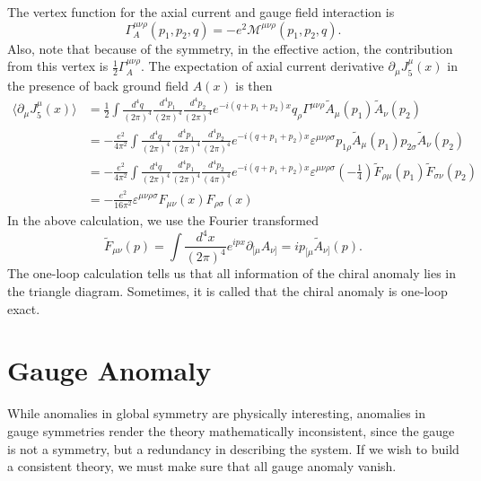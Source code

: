 \documentclass[aps,prb,superscriptaddress,nofootinbib]{revtex4}
\begin{document}
The vertex function for the axial current and gauge field interaction is
\begin{equation}
	\Gamma_A^{\mu\nu\rho}(p_1,p_2,q) = -e^2 \mathcal{M}^{\mu\nu\rho}(p_1,p_2,q).
\end{equation}
Also, note that because of the symmetry, in the effective action, the contribution from this vertex is $\frac{1}{2}\Gamma_A^{\mu\nu\rho}$. 
The expectation of axial current derivative $\partial_\mu J_5^\mu(x)$ in the presence of back ground field $A(x)$ is then
\begin{equation}
\begin{aligned}
	\langle \partial_\mu J_5^\mu(x) \rangle 
	&= \frac{1}{2} \int \frac{d^4 q}{(2\pi)^4}\frac{d^4 p_1}{(2\pi)^4}\frac{d^4 p_2}{(2\pi)^4} e^{-i(q+p_1+p_2)x} q_\rho \Gamma^{\mu\nu\rho} \tilde A_\mu(p_1) \tilde A_\nu(p_2) \\
	&= -\frac{e^2}{4\pi^2} \int \frac{d^4 q}{(2\pi)^4}\frac{d^4 p_1}{(2\pi)^4}\frac{d^4 p_2}{(2\pi)^4} e^{-i(q+p_1+p_2)x} \varepsilon^{\mu\nu\rho\sigma} p_{1\rho} \tilde A_\mu(p_1) p_{2\sigma} \tilde A_\nu(p_2) \\
	&= -\frac{e^2}{4\pi^2} \int \frac{d^4 q}{(2\pi)^4}\frac{d^4 p_1}{(2\pi)^4}\frac{d^4 p_2}{(4\pi)^4} e^{-i(q+p_1+p_2)x} \varepsilon^{\mu\nu\rho\sigma} \left(-\frac{1}{4}\right)\tilde F_{\rho\mu}(p_1) \tilde F_{\sigma\nu}(p_2) \\
	&= -\frac{e^2}{16\pi^2} \varepsilon^{\mu\nu\rho\sigma} F_{\mu\nu}(x) F_{\rho\sigma}(x)
\end{aligned}
\end{equation}
In the above calculation, we use the Fourier transformed 
\begin{equation}
	\tilde F_{\mu\nu}(p) = \int \frac{d^4 x}{(2\pi)^4} e^{ipx} \partial_{[\mu} A_{\nu]}
	= i p_{[\mu} \tilde A_{\nu]}(p).
\end{equation}
The one-loop calculation tells us that all information of the chiral anomaly lies in the triangle diagram.
Sometimes, it is called that the chiral anomaly is one-loop exact.



\section{Gauge Anomaly}
While anomalies in global symmetry are physically interesting, anomalies in gauge symmetries render the theory mathematically inconsistent, since the gauge is not a symmetry, but a redundancy in describing the system.
If we wish to build a consistent theory, we must make sure that all gauge anomaly vanish.
\end{document}
